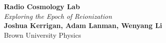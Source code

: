 \documentclass[a0,landscape]{a0poster}
\begin{document}

\begin{minipage}[b]{0.5\textwidth}
\veryHuge \color{NavyBlue} \textbf{Radio Cosmology Lab} \color{Black}\\ %
\Huge\textit{Exploring the Epoch of Reionization}\\[1cm] %
\huge \textbf{Joshua Kerrigan, Adam Lanman, Wenyang Li}\\ %
\huge Brown University Physics\\ %
\end{minipage}



%
%
\end{document}
